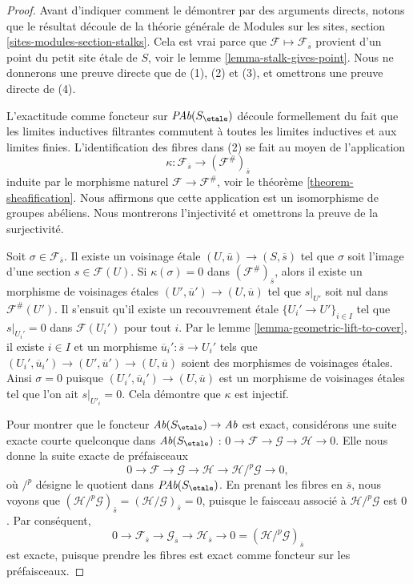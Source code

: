 \begin{proof}
Avant d'indiquer comment le d\'emontrer par des arguments directs,
notons que le r\'esultat d\'ecoule de la th\'eorie g\'en\'erale de
Modules sur les sites, section \ref{sites-modules-section-stalks}.
Cela est vrai parce que $\mathcal{F} \mapsto \mathcal{F}_{\overline{s}}$
provient d'un point du petit site \'etale de $S$, voir le
lemme \ref{lemma-stalk-gives-point}.
Nous ne donnerons une preuve directe que de (1), (2) et (3), et omettrons
une preuve directe de (4).

\medskip\noindent
L'exactitude comme foncteur sur $\textit{PAb}(S_\etale)$ d\'ecoule formellement du
fait que les limites inductives filtrantes commutent \`a toutes les limites inductives et aux
limites finies. L'identification des fibres dans (2) se fait au moyen de l'application
$$
\kappa :
\mathcal{F}_{\overline{s}}
\longrightarrow
(\mathcal{F}^\#)_{\overline{s}}
$$
induite par le morphisme naturel $\mathcal{F}\to \mathcal{F}^\#$, voir le
th\'eor\`eme \ref{theorem-sheafification}.
Nous affirmons que cette application est un isomorphisme de groupes ab\'eliens. Nous montrerons
l'injectivit\'e et omettrons la preuve de la surjectivit\'e.

\medskip\noindent
Soit $\sigma\in \mathcal{F}_{\overline{s}}$.
Il existe un voisinage \'etale
$(U, \overline{u})\to (S, \overline{s})$ tel que $\sigma$ soit l'image d'une
section $s \in \mathcal{F}(U)$. Si $\kappa(\sigma) = 0$ dans
$(\mathcal{F}^\#)_{\overline{s}}$, alors il existe un morphisme de voisinages \'etales
$(U', \overline{u}')\to (U, \overline{u})$ tel que
$s|_{U'}$ soit nul dans $\mathcal{F}^\#(U')$. Il s'ensuit qu'il
existe un recouvrement \'etale
$\{U_i'\to U'\}_{i\in I}$ tel que $s|_{U_i'}=0$ dans
$\mathcal{F}(U_i')$ pour tout $i$. Par le lemme \ref{lemma-geometric-lift-to-cover},
il existe $i \in I$ et un morphisme
$\overline{u}_i': \overline{s} \to U_i'$ tels que
$(U_i', \overline{u}_i') \to (U', \overline{u}')\to (U, \overline{u})$
soient des morphismes de voisinages \'etales. Ainsi $\sigma = 0$
puisque $(U_i', \overline{u}_i') \to (U, \overline{u})$
est un morphisme de voisinages \'etales tel que
l'on ait $s|_{U'_i}=0$. Cela d\'emontre que $\kappa$ est injectif.

\medskip\noindent
Pour montrer que le foncteur $\textit{Ab}(S_\etale) \to \textit{Ab}$ est
exact, consid\'erons une suite exacte courte quelconque dans $\textit{Ab}(S_\etale)$ :
$
0\to \mathcal{F}\to \mathcal{G}\to \mathcal H \to 0.
$
Elle nous donne la suite exacte de pr\'efaisceaux
$$
0 \to \mathcal{F} \to \mathcal{G} \to \mathcal H \to
\mathcal H/^p\mathcal{G} \to 0,
$$
o\`u $/^p$ d\'esigne le quotient dans $\textit{PAb}(S_\etale)$.
En prenant les fibres en
$\overline{s}$, nous voyons que $(\mathcal H /^p\mathcal{G})_{\bar{s}} =
(\mathcal H /\mathcal{G})_{\bar{s}} = 0$, puisque le faisceau associ\'e \`a
$\mathcal H/^p\mathcal{G}$ est $0$.
Par cons\'equent,
$$
0\to \mathcal{F}_{\overline{s}} \to \mathcal{G}_{\overline{s}} \to
\mathcal{H}_{\overline{s}} \to 0 = (\mathcal H/^p\mathcal{G})_{\overline{s}}
$$
est exacte, puisque prendre les fibres est exact comme foncteur sur les pr\'efaisceaux.
\end{proof}

